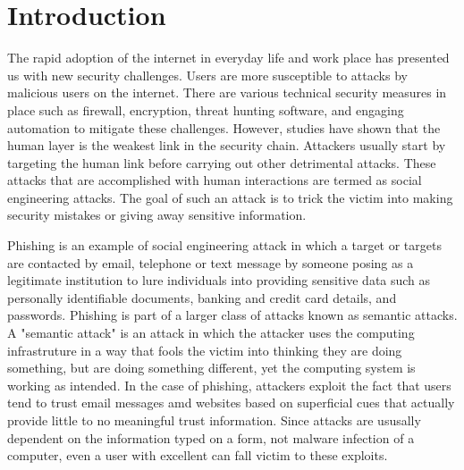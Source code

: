 

\pagestyle{plain} %
\setcounter{page}{1}
\chapter{Introduction}
The rapid adoption of the internet in everyday life and work place has presented us with new security challenges. Users are more susceptible to attacks by malicious users on the internet. There are various technical security measures in place such as firewall, encryption, threat hunting software, and engaging automation to mitigate these challenges. However, studies have shown that the human layer is the weakest link in the security chain\cite{jampen}. Attackers usually start by targeting the human link before carrying out other detrimental attacks. These attacks that are accomplished with  human interactions are termed as social engineering attacks. The goal of such an attack is to trick the victim into making security mistakes or giving away sensitive information.

Phishing is an example of social engineering attack in which a target or targets are contacted by email, telephone or text message by someone posing as a legitimate institution to lure individuals into providing sensitive data such as personally identifiable documents, banking and credit card details, and passwords\cite{phishing, apwg}.  Phishing is part of a larger class of attacks known as semantic attacks. A "semantic attack" is an attack in which the attacker uses the computing infrastruture in a way that fools the victim into thinking they are doing something, but are doing something different, yet the computing system is working as intended. In the case  of phishing, attackers exploit the fact that users tend to trust email messages amd websites based on superficial cues that actually provide little to no meaningful trust information\cite{what_hack}. Since attacks are ususally dependent on the information typed on a form, not malware infection of a computer, even a user with excellent can fall victim to these exploits.


